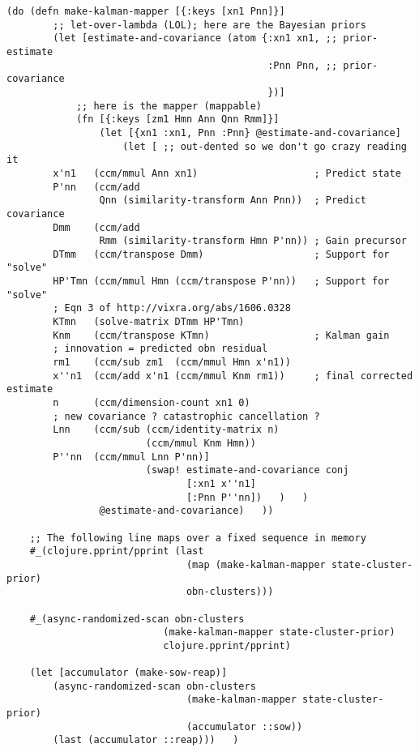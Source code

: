 \documentclass[10pt,oneside,x11names]{article}
\begin{document}
\begin{verbatim}
(do (defn make-kalman-mapper [{:keys [xn1 Pnn]}]
        ;; let-over-lambda (LOL); here are the Bayesian priors
        (let [estimate-and-covariance (atom {:xn1 xn1, ;; prior-estimate
                                             :Pnn Pnn, ;; prior-covariance
                                             })]
            ;; here is the mapper (mappable)
            (fn [{:keys [zm1 Hmn Ann Qnn Rmm]}]
                (let [{xn1 :xn1, Pnn :Pnn} @estimate-and-covariance]
                    (let [ ;; out-dented so we don't go crazy reading it
        x'n1   (ccm/mmul Ann xn1)                    ; Predict state
        P'nn   (ccm/add
                Qnn (similarity-transform Ann Pnn))  ; Predict covariance
        Dmm    (ccm/add
                Rmm (similarity-transform Hmn P'nn)) ; Gain precursor
        DTmm   (ccm/transpose Dmm)                   ; Support for "solve"
        HP'Tmn (ccm/mmul Hmn (ccm/transpose P'nn))   ; Support for "solve"
        ; Eqn 3 of http://vixra.org/abs/1606.0328
        KTmn   (solve-matrix DTmm HP'Tmn)
        Knm    (ccm/transpose KTmn)                  ; Kalman gain
        ; innovation = predicted obn residual
        rm1    (ccm/sub zm1  (ccm/mmul Hmn x'n1))
        x''n1  (ccm/add x'n1 (ccm/mmul Knm rm1))     ; final corrected estimate
        n      (ccm/dimension-count xn1 0)
        ; new covariance ? catastrophic cancellation ?
        Lnn    (ccm/sub (ccm/identity-matrix n)
                        (ccm/mmul Knm Hmn))
        P''nn  (ccm/mmul Lnn P'nn)]
                        (swap! estimate-and-covariance conj
                               [:xn1 x''n1]
                               [:Pnn P''nn])   )   )
                @estimate-and-covariance)   ))

    ;; The following line maps over a fixed sequence in memory
    #_(clojure.pprint/pprint (last
                               (map (make-kalman-mapper state-cluster-prior)
                               obn-clusters)))

    #_(async-randomized-scan obn-clusters
                           (make-kalman-mapper state-cluster-prior)
                           clojure.pprint/pprint)

    (let [accumulator (make-sow-reap)]
        (async-randomized-scan obn-clusters
                               (make-kalman-mapper state-cluster-prior)
                               (accumulator ::sow))
        (last (accumulator ::reap)))   )
\end{verbatim}
\end{document}

